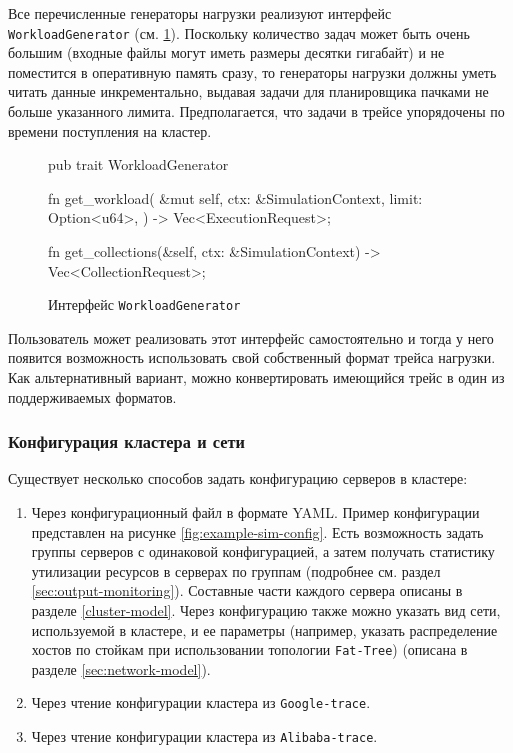 Все перечисленные генераторы нагрузки реализуют интерфейс \texttt{WorkloadGenerator} (см. \ref{fig:workload-generator-trait}). Поскольку количество задач может быть очень большим (входные файлы могут иметь размеры десятки гигабайт) и не поместится в оперативную память сразу, то генераторы нагрузки должны уметь читать данные инкрементально, выдавая задачи для планировщика пачками не больше указанного лимита. Предполагается, что задачи в трейсе упорядочены по времени поступления на кластер. 
\begin{figure}[h!]
    \footnotesize
\begin{rustcode}
pub trait WorkloadGenerator {
  fn get_workload(
    &mut self, ctx: &SimulationContext, limit: Option<u64>,
  ) -> Vec<ExecutionRequest>;
  
  fn get_collections(&self, ctx: &SimulationContext) -> Vec<CollectionRequest>;
}
\end{rustcode}
    \caption{Интерфейс \texttt{WorkloadGenerator}}
    \label{fig:workload-generator-trait}
\end{figure}

Пользователь может реализовать этот интерфейс самостоятельно и тогда у него появится возможность использовать свой собственный формат трейса нагрузки. Как альтернативный вариант, можно конвертировать имеющийся трейс в один из поддерживаемых форматов.

\subsubsection{Конфигурация кластера и сети}

Существует несколько способов задать конфигурацию серверов в кластере: 
\begin{enumerate}
    \item Через конфигурационный файл в формате YAML. Пример конфигурации представлен на рисунке \ref{fig:example-sim-config}. Есть возможность задать группы серверов с одинаковой конфигурацией, а затем получать статистику утилизации ресурсов в серверах по группам (подробнее см. раздел \ref{sec:output-monitoring}). Составные части каждого сервера описаны в разделе \ref{cluster-model}. Через конфигурацию также можно указать вид сети, используемой в кластере, и ее параметры (например, указать распределение хостов по стойкам при использовании топологии \texttt{Fat-Tree}) (описана в разделе \ref{sec:network-model}).
    \item Через чтение конфигурации кластера из \texttt{Google-trace}.
    \item Через чтение конфигурации кластера из \texttt{Alibaba-trace}.
\end{enumerate}

